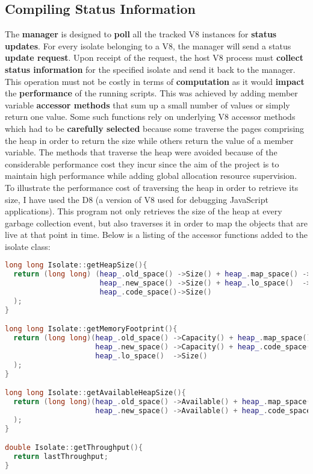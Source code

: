 \documentclass{l4proj}
\begin{document}
\subsection{Compiling Status Information}
\hspace*{3em} The \textbf{manager} is designed to \textbf{poll} all the tracked V8 instances for \textbf{status updates}. For every isolate belonging to a V8, the manager will send a status \textbf{update request}. Upon receipt of the request, the host V8 process must \textbf{collect status information} for the specified isolate and send it back to the manager. This operation must not be costly in terms of \textbf{computation} as it would \textbf{impact} the \textbf{performance} of the running scripts. This was achieved by adding member variable \textbf{accessor methods} that sum up a small number of values or simply return one value. Some such functions rely on underlying V8 accessor methods which had to be \textbf{carefully selected} because some traverse the pages comprising the heap in order to return the size while others return the value of a member variable. The methods that traverse the heap were avoided because of the considerable performance cost they incur since the aim of the project is to maintain high performance while adding global allocation resource supervision. To illustrate the performance cost of traversing the heap in order to retrieve its size, I have used the D8 (a version of V8 used for debugging JavaScript applications). This program not only retrieves the size of the heap at every garbage collection event, but also traverses it in order to map the objects that are live at that point in time. Below is a listing of the accessor functions added to the isolate class:
\begin{lstlisting}[language=cpp]
long long Isolate::getHeapSize(){
  return (long long) (heap_.old_space() ->Size() + heap_.map_space() ->Size() +
                      heap_.new_space() ->Size() + heap_.lo_space()  ->Size() +
                      heap_.code_space()->Size()
  );
}

long long Isolate::getMemoryFootprint(){
  return (long long)(heap_.old_space() ->Capacity() + heap_.map_space() ->Capacity() +
                     heap_.new_space() ->Capacity() + heap_.code_space()->Capacity() +
                     heap_.lo_space()  ->Size()
  );
}

long long Isolate::getAvailableHeapSize(){
  return (long long)(heap_.old_space() ->Available() + heap_.map_space() ->Available() +
                     heap_.new_space() ->Available() + heap_.code_space()->Available()
  );
}

double Isolate::getThroughput(){
  return lastThroughput;
}
\end{lstlisting}
\end{document}
